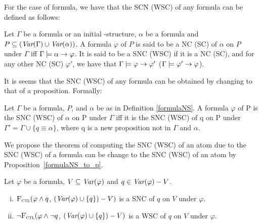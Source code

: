 \documentclass{article}
\begin{document}
For the case of formula, we have that the SCN (WSC) of any formula can be defined as follows:
\begin{definition}\label{formulaNS}
    Let $\Gamma$ be a formula or an initial \MPK-structure, $\alpha$ be a formula and $P\subseteq (\textit{Var}(\Gamma) \cup \textit{Var}(\alpha))$. A formula $\varphi$ of $P$ is  said to be a NC (SC) of $\alpha$ on $P$ under $\Gamma$ iff $\Gamma \models \alpha \rightarrow \varphi$. It is said to be a SNC (WSC) if it is a NC (SC), and for any other NC (SC) $\varphi'$, we have that $\Gamma \models \varphi \rightarrow \varphi'$ ($\Gamma \models \varphi' \rightarrow \varphi$).
    \end{definition}


  It is seems that the SNC (WSC) of any formula can be obtained by changing to that of a proposition. Formally:
\begin{proposition}\label{formulaNS_to_p}
     Let $\Gamma$ be a formula, $P$, and $\alpha$ be as in Definition \ref{formulaNS}. A formula $\varphi$ of P is the SNC (WSC) of $\alpha$ on P under  $\Gamma$ iff it is the SNC (WSC) of q on P under $\Gamma' = \Gamma \cup \{q \equiv \alpha\}$, where q is a new proposition not in $\Gamma$ and $\alpha$.
    \end{proposition}

We propose the theorem of computing the SNC (WSC) of an atom due to the SNC (WSC) of a formula can be change to the SNC (WSC) of an atom by Proposition~\ref{formulaNS_to_p}.
\begin{theorem}\label{thm:SNC:WSC:forget}
 Let $\varphi$ be a formula, $V\subseteq\textit{Var}(\varphi)$ and $q\in\textit{Var}(\varphi)-V$.
 \begin{enumerate}[(i)]
   \item ${\textsc{F}_{\textsc{ctl}}} (\varphi \land q$, $(\textit{Var}(\varphi) \cup \{q\})-V)$
   is a SNC of $q$ on $V$ under $\varphi$.
   \item  $\neg{\textsc{F}_{\textsc{ctl}}} (\varphi \land \neg q$, $(\textit{Var}(\varphi) \cup \{q\})-V)$
   is a WSC of $q$ on $V$ under $\varphi$.
 \end{enumerate}
 \end{theorem}
\end{document}
